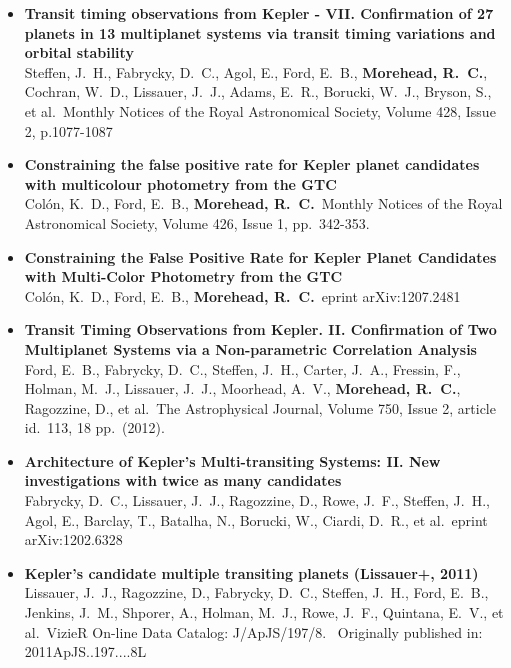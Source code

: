 \documentclass[12pt,letterpaper,sans]{moderncv} %
\begin{document}
\begin{itemize}
 \item \textbf{ Transit timing observations from Kepler - VII. Confirmation 
of 27 planets in 13 multiplanet systems via transit timing variations and 
orbital stability } \\ Steffen, J.~H., Fabrycky, D.~C., Agol, E., Ford, 
E.~B., \textbf{Morehead, R.~C.}, Cochran, W.~D., Lissauer, J.~J., Adams, E.~R., 
Borucki, W.~J., Bryson, S., et al.\ Monthly Notices of the Royal 
Astronomical Society, Volume 428, Issue 2, p.1077-1087 \\ 

 \item \textbf{ Constraining the false positive rate for Kepler planet 
candidates with multicolour photometry from the GTC } \\ Col{\'o}n, K.~D., 
Ford, E.~B., \textbf{Morehead, R.~C.}\ Monthly Notices of the Royal Astronomical 
Society, Volume 426, Issue 1, pp.~342-353.\ \\ 

 \item \textbf{ Constraining the False Positive Rate for Kepler Planet 
Candidates with Multi-Color Photometry from the GTC } \\ Col{\'o}n, K.~D., 
Ford, E.~B., \textbf{Morehead, R.~C.}\ eprint arXiv:1207.2481 \\ 

 \item \textbf{ Transit Timing Observations from Kepler. II. Confirmation 
of Two Multiplanet Systems via a Non-parametric Correlation Analysis } \\ 
Ford, E.~B., Fabrycky, D.~C., Steffen, J.~H., Carter, J.~A., Fressin, F., 
Holman, M.~J., Lissauer, J.~J., Moorhead, A.~V., \textbf{Morehead, R.~C.}, 
Ragozzine, D., et al.\ The Astrophysical Journal, Volume 750, Issue 2, 
article id.~113, 18 pp.~(2012).\ \\ 

 \item \textbf{ Architecture of Kepler's Multi-transiting Systems: II. New 
investigations with twice as many candidates } \\ Fabrycky, D.~C., 
Lissauer, J.~J., Ragozzine, D., Rowe, J.~F., Steffen, J.~H., Agol, E., 
Barclay, T., Batalha, N., Borucki, W., Ciardi, D.~R., et al.\ eprint 
arXiv:1202.6328 \\ 


 \item \textbf{ Kepler's candidate multiple transiting planets (Lissauer+, 
2011) } \\ Lissauer, J.~J., Ragozzine, D., Fabrycky, D.~C., Steffen, J.~H., 
Ford, E.~B., Jenkins, J.~M., Shporer, A., Holman, M.~J., Rowe, J.~F., 
Quintana, E.~V., et al.\ VizieR On-line Data Catalog: J/ApJS/197/8.~ 
Originally published in: 2011ApJS..197....8L \\ 


\end{itemize}
\end{document}
